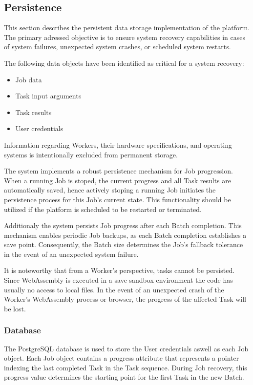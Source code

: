 \subsection{Persistence}
\label{subsec:implementation:architecture:persistence}
This section describes the persistent data storage implementation of the platform. The primary adressed objective is to ensure system recovery capabilities in cases of system failures, unexpected system crashes, or scheduled system restarts.

The following data objects have been identified as critical for a system recovery:
\begin{itemize}
    \item Job data
    \item Task input arguments
    \item Task results
    \item User credentials
\end{itemize}
Information regarding Workers, their hardware specifications, and operating systems is intentionally excluded from permanent storage.

The system implements a robust persistence mechanism for Job progression. When a running Job is stoped, the current progress and all Task results are automatically saved, hence actively stoping a running Job initiates the persistence process for this Job's current state. This functionality should be utilized if the platform is scheduled to be restarted or terminated.

Additionaly the system persists Job progress after each Batch completion. This mechanism enables periodic Job backups, as each Batch completion establishes a save point. Consequently, the Batch size determines the Job's fallback tolerance in the event of an unexpected system failure.

It is noteworthy that from a Worker's perspective, tasks cannot be persisted. Since WebAssembly is executed in a save sandbox environment the code has usually no access to local files. In the event of an unexpected crash of the Worker's WebAssembly process or browser, the progress of the affected Task will be lost.

\subsubsection{Database}
The PostgreSQL database is used to store the User credentials aswell as each Job object. Each Job object contains a progress attribute that represents a pointer indexing the last completed Task in the Task sequence. During Job recovery, this progress value determines the starting point for the first Task in the new Batch.

